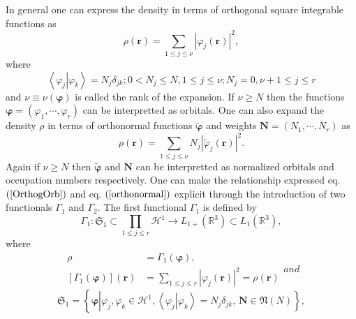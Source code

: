 \documentclass[aps,preprint]{revtex4}%
\begin{document}
In general one can express the density in terms of orthogonal square
integrable functions as
\begin{equation}
\rho\left(  \boldsymbol{r}\right)  =\sum_{1\leq j\leq\nu}\left\vert
\varphi_{j}\left(  \boldsymbol{r}\right)  \right\vert ^{2}, \label{OrthogOrb}%
\end{equation}
where
\begin{equation}
\left\langle \left.  \varphi_{j}\right\vert \varphi_{k}\right\rangle
=N_{j}\delta_{jk};0<N_{j}\leq N,1\leq j\leq\nu;N_{j}=0,\nu+1\leq j\leq r
\end{equation}
and $\nu\equiv\nu\left(  \boldsymbol{\varphi}\right)  $ is called the rank of
the expansion. If $\nu\geq N$ then the functions $\boldsymbol{\varphi}=\left(
\varphi_{1},\cdots,\varphi_{r}\right)  $ can be interpretted as orbitals. One
can also expand the density $\rho$ in terms of orthonormal functions
$\boldsymbol{\tilde{\varphi}}$ and weights $\boldsymbol{N}=\left(
N_{1},\cdots,N_{r}\right)  $ as
\begin{equation}
\rho\left(  \boldsymbol{r}\right)  =\sum_{1\leq j\leq\nu}N_{j}\left\vert
\tilde{\varphi}_{j}\left(  \boldsymbol{r}\right)  \right\vert ^{2}.
\label{orthonormal}%
\end{equation}
Again if $\nu\geq N$ then $\boldsymbol{\tilde{\varphi}}$ and $\boldsymbol{N}$
can be interpretted as normalized orbitals and occupation numbers
respectively. One can make the relationship expressed eq. $\left(
\ref{OrthogOrb}\right)  $ and eq. $\left(  \ref{orthonormal}\right)  $
explicit through the introduction of two functionals $\Gamma_{1}$ and
$\Gamma_{2}.$ The first functional $\Gamma_{1}$ is defined by
\begin{equation}
\Gamma_{1}:\mathfrak{S}_{1}\subset\prod\limits_{1\leq j\leq r}\mathcal{H}%
^{1}\rightarrow L_{1+}\left(  \mathbb{R}^{3}\right)  \subset L_{1}\left(
\mathbb{R}^{3}\right)  ,
\end{equation}
where
\begin{subequations}
\label{GammaAll}%
\begin{align}
\rho &  =\Gamma_{1}\left(  \boldsymbol{\varphi}\right)  ,\\
\left[  \Gamma_{1}\left(  \boldsymbol{\varphi}\right)  \right]  \left(
\boldsymbol{r}\right)   &  =\sum_{1\leq j\leq r}\left\vert \varphi_{j}\left(
\boldsymbol{r}\right)  \right\vert ^{2}=\rho\left(  \boldsymbol{r}\right)
\label{Gamma}%
\end{align}
and%
\end{subequations}
\begin{equation}
\mathfrak{S}_{1}=\left\{  \boldsymbol{\varphi}\left\vert \varphi_{j}%
,\varphi_{k}\in\mathcal{H}^{1},\left\langle \left.  \varphi_{j}\right\vert
\varphi_{k}\right\rangle =N_{j}\delta_{jk},\,\boldsymbol{N}\in\mathfrak{N}%
\left(  N\right)  \right.  \right\}  , \label{set1}%
\end{equation}
\end{document}
